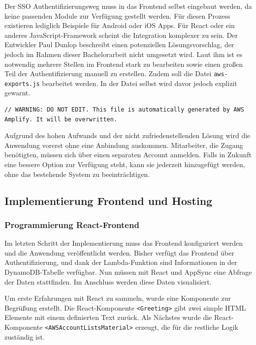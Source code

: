 Der SSO Authentifizierungsweg muss in das Frontend selbst eingebaut werden, da keine passenden Module zur Verfügung gestellt werden.
Für diesen Prozess existieren lediglich Beispiele für Android oder iOS Apps.
Für React oder ein anderes JavaScript-Framework scheint die Integration komplexer zu sein.
Der Entwickler Paul Dunlop beschreibt einen potenziellen Lösungsvorschlag, der jedoch im Rahmen dieser Bachelorarbeit nicht umgesetzt wird.
Laut ihm ist es notwendig mehrere Stellen im Frontend stark zu bearbeiten sowie einen großen Teil der Authentifizierung manuell zu erstellen.
Zudem soll die Datei \verb+aws-exports.js+ bearbeitet werden.
In der Datei selbst wird davor jedoch explizit gewarnt.\cite{AzureADProbleme}

\begin{lstlisting}[basicstyle=\ttfamily\small, breaklines=true , frame = single, backgroundcolor=\color{flashwhite}, caption={Auszug aws-exports.js} ]
// WARNING: DO NOT EDIT. This file is automatically generated by AWS Amplify. It will be overwritten.
\end{lstlisting}

Aufgrund des hohen Aufwands und der nicht zufriedenstellenden Lösung wird die Anwendung vorerst ohne eine Anbindung auskommen.
Mitarbeiter, die Zugang benötigten, müssen sich über einen separaten Account anmelden.
Falls in Zukunft eine bessere Option zur Verfügung steht, kann sie jederzeit hinzugefügt werden, ohne das bestehende System zu beeinträchtigen.


\subsection{Implementierung Frontend und Hosting}

\subsubsection{Programmierung React-Frontend}
\label{ReactFrontend}
Im letzten Schritt der Implementierung muss das Frontend konfiguriert werden und die Anwendung veröffentlicht werden.
Bisher verfügt das Frontend über Authentifizierung, und dank der Lambda-Funktion sind Informationen in der DynamoDB-Tabelle verfügbar.
Nun müssen mit React und AppSync eine Abfrage der Daten stattfinden.
Im Anschluss werden diese Daten visualisiert.

Um erste Erfahrungen mit React zu sammeln, wurde eine Komponente zur Begrüßung erstellt.
Die React-Komponente \verb+<Greeting>+ gibt zwei simple HTML Elemente mit einem definierten Text zurück.
Als Nächstes wurde die React-Komponente \verb+<AWSAccountListsMaterial>+ erzeugt, die für die restliche Logik zuständig ist.

